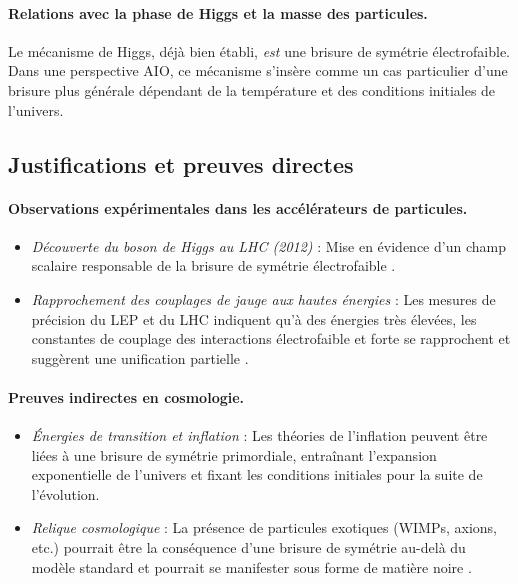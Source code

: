\documentclass[12pt]{article}
\begin{document}
\paragraph{Relations avec la phase de Higgs et la masse des particules.}
Le mécanisme de Higgs, déjà bien établi, \emph{est} une brisure de symétrie électrofaible. 
Dans une perspective AIO, ce mécanisme s'insère comme un cas particulier d'une brisure 
plus générale dépendant de la température et des conditions initiales de l'univers.

\subsection{Justifications et preuves directes}

\paragraph{Observations expérimentales dans les accélérateurs de particules.}
\begin{itemize}
    \item \emph{Découverte du boson de Higgs au LHC (2012)} : Mise en évidence d'un 
    champ scalaire responsable de la brisure de symétrie électrofaible \cite{lhc2012higgs}.
    \item \emph{Rapprochement des couplages de jauge aux hautes énergies} : 
    Les mesures de précision du LEP et du LHC indiquent qu'à des énergies très élevées, 
    les constantes de couplage des interactions électrofaible et forte se rapprochent 
    et suggèrent une unification partielle \cite{amaldi1991precision}.
\end{itemize}

\paragraph{Preuves indirectes en cosmologie.}
\begin{itemize}
    \item \emph{Énergies de transition et inflation} : Les théories de l'inflation 
    peuvent être liées à une brisure de symétrie primordiale, entraînant l'expansion 
    exponentielle de l'univers et fixant les conditions initiales pour la suite de l'évolution.
    \item \emph{Relique cosmologique} : La présence de particules exotiques (WIMPs, axions, etc.) 
    pourrait être la conséquence d'une brisure de symétrie au-delà du modèle standard 
    et pourrait se manifester sous forme de matière noire \cite{arkani1998hierarchies}.
\end{itemize}
\end{document}

